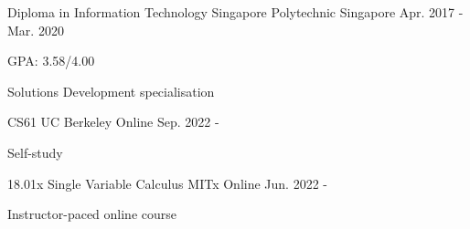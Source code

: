 

\begin{cventries}

  \cventry
    {Diploma in Information Technology} %
    {Singapore Polytechnic} %
    {Singapore} %
    {Apr. 2017 - Mar. 2020} %
    {
      \begin{cvitems} %
        \item {GPA: 3.58/4.00}
        \item {Solutions Development specialisation}
      \end{cvitems}
    }

    \cventry
    {CS61} %
    {UC Berkeley} %
    {Online} %
    {Sep. 2022 - } %
    {
      \begin{cvitems} %
        \item {Self-study}
      \end{cvitems}
    }

    \cventry
    {18.01x Single Variable Calculus} %
    {MITx} %
    {Online} %
    {Jun. 2022 - } %
    {
      \begin{cvitems} %
        \item {Instructor-paced online course}
      \end{cvitems}
    }


\end{cventries}
